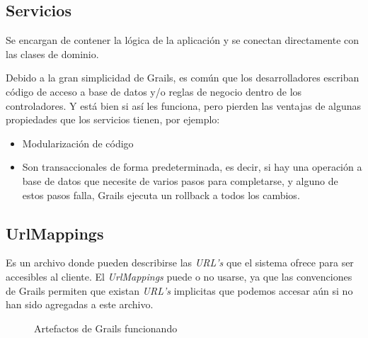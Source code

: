 \subsection{Servicios}
Se encargan de contener la l\'ogica de la aplicaci\'on y se conectan directamente con las clases de dominio.

Debido a la gran simplicidad de Grails, es com\'un que los desarrolladores escriban c\'odigo de acceso a base de datos y/o reglas de negocio dentro de los controladores. Y est\'a bien si as\'i les funciona, pero pierden las ventajas de algunas propiedades que los servicios tienen, por ejemplo:

\begin{itemize}
 \item Modularizaci\'on de c\'odigo
 \item Son transaccionales de forma predeterminada, es decir, si hay una operaci\'on a base de datos que necesite de varios pasos para completarse, y alguno de estos pasos falla, Grails ejecuta un rollback a todos los cambios.
\end{itemize}



\subsection{UrlMappings}
Es un archivo donde pueden describirse las \textit{URL's} que el sistema ofrece para ser accesibles al cliente. El \textit{UrlMappings} puede o no usarse, ya que las convenciones de Grails permiten que existan \textit{URL's} implicitas que podemos accesar aún si no han sido agregadas a este archivo.

\begin{figure}[ht!]
    \caption{Artefactos de Grails funcionando}
\end{figure}